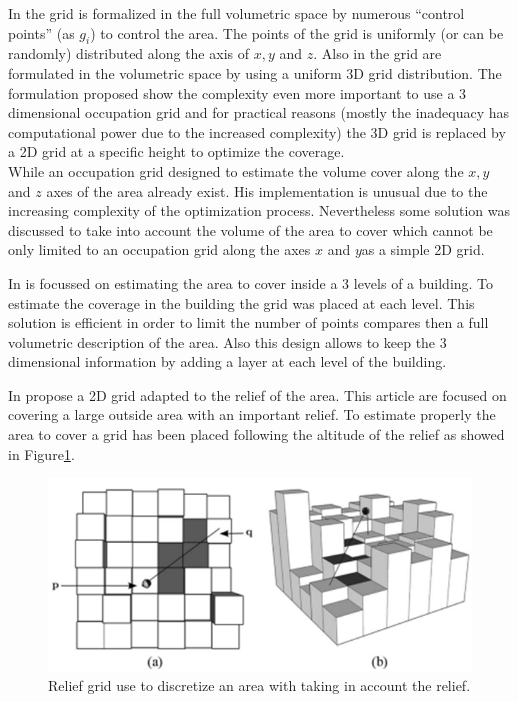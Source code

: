 In \cite{82*chrysostomou2012} the grid is formalized in the full volumetric space by numerous “control points” (as $g_i$) to control the area. The points of the grid is uniformly (or can be randomly) distributed along the axis of $x, y$ and $z$. Also in \cite{87*morsly2012} the grid are formulated in the volumetric space by using a uniform 3D grid distribution. The formulation proposed show the complexity even more important to use a 3 dimensional occupation grid and for practical reasons (mostly the inadequacy has computational power due to the increased complexity) the 3D grid is replaced by a 2D grid at a specific height to optimize the coverage. \\ 

While an occupation grid designed to estimate the volume cover along the $ x, y $ and $ z $ axes of the area already exist. His implementation is unusual due to the increasing complexity of the optimization process.  
Nevertheless some solution was discussed \citep{141*akbarzadeh2013,83*van2009} to take into account the volume of the area to cover which cannot be only limited to an occupation grid along the axes $ x $ and $ y $as a simple 2D grid.

In \cite{83*van2009} is focussed on estimating the area to cover inside a 3 levels of a building. To estimate the coverage in the building the grid was placed at each level. This solution is efficient in order to limit the number of points compares then a full volumetric description of the area. Also this design allows to keep the 3 dimensional information by adding a layer at each level of the building.  

In \citep{141*akbarzadeh2013} propose a 2D grid adapted to the relief of the area. This article are focused on covering a large outside area with an important relief. To estimate properly the area to cover a grid has been placed following the altitude of the relief as showed in Figure\ref{fig:grilleRef141}. 

\begin{figure}[t!]
\begin{center}
   \includegraphics[width=\linewidth]{img/grilleRef141.png}
  \caption{Relief grid use to discretize  an area with taking in account the relief.}\label{fig:grilleRef141}
  \endminipage\hfill
  \end{center}
\end{figure}


